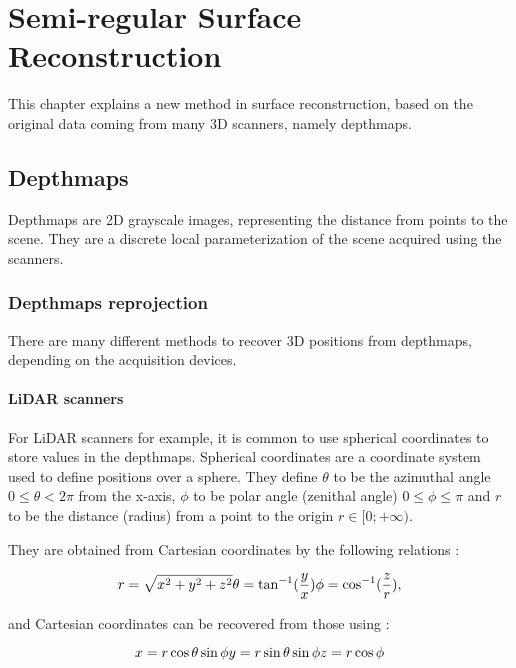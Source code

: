 \documentclass[11pt,fleqn]{book} %
\begin{document}
\chapter{Semi-regular Surface Reconstruction}

This chapter explains a new method in surface reconstruction, based on the original data coming from many 3D scanners, namely depthmaps.

\section{Depthmaps}
Depthmaps are 2D grayscale images, representing the distance from points to the scene. They are a discrete local parameterization of the scene acquired using the scanners.

\subsection{Depthmaps reprojection}
There are many different methods to recover 3D positions from depthmaps, depending on the acquisition devices.

\subsubsection{LiDAR scanners}
For LiDAR scanners for example, it is common to use spherical coordinates to store values in the depthmaps.
Spherical coordinates \cite{Wal67} are a coordinate system used to define positions over a sphere. 
They define $\theta$ to be the azimuthal angle $0 \leq \theta < 2\pi$ from the x-axis, $\phi$ to be polar angle (zenithal angle) $0 \leq \phi \leq \pi$ and $r$ to be the distance (radius) from a point to the origin $r \in [0;+\infty)$.

They are obtained from Cartesian coordinates by the following relations : 

\begin{equation}
\label{eq:cartesian_to_spherical}
	r = \sqrt{x^2 + y^2 + z^2} \\
	\theta = \tan^{-1}(\frac{y}{x})\\
	\phi = \cos^{-1}(\frac{z}{r}),
\end{equation}

and Cartesian coordinates can be recovered from those using : 

\begin{equation}
\label{eq:spherical_to_cartesian}
	x = r\cos\theta\sin\phi\\
	y = r\sin\theta\sin\phi\\
	z = r\cos\phi
\end{equation}
\end{document}
